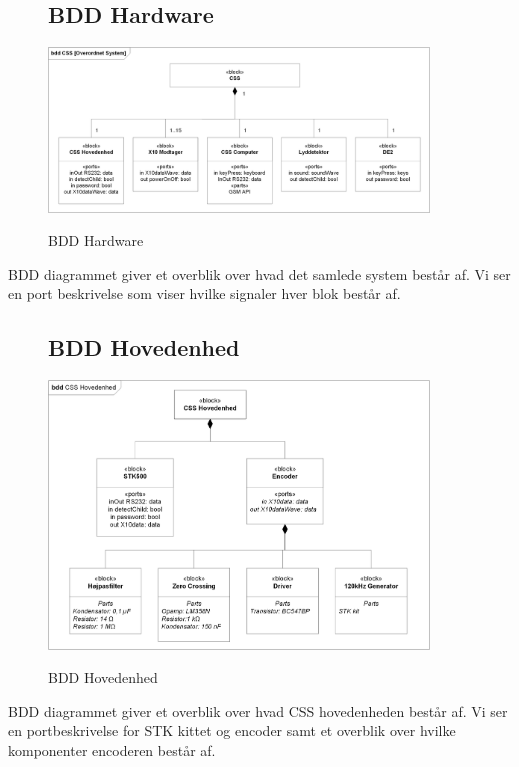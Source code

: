 \begin{figure}[!htbp] \centering
\subsection{BDD Hardware}
{\includegraphics[width=0.9\textwidth]{billeder/diagrammer/BDD_Hardware}}
\caption{BDD Hardware}
\label{lab:bddhardware}
\raggedright
\end{figure}
BDD diagrammet giver et overblik over hvad det samlede system består af. Vi ser en port beskrivelse som viser hvilke signaler hver blok består af.

\begin{figure}[!htbp] \centering
\subsection{BDD Hovedenhed}
{\includegraphics[width=0.9\textwidth]{billeder/diagrammer/BDD_Hovedenhed}}
\caption{BDD Hovedenhed}
\label{lab:bddhovedenhed}
\raggedright
\end{figure}
BDD diagrammet giver et overblik over hvad CSS hovedenheden består af. Vi ser en portbeskrivelse for STK kittet og encoder samt et overblik over hvilke komponenter encoderen består af. 

